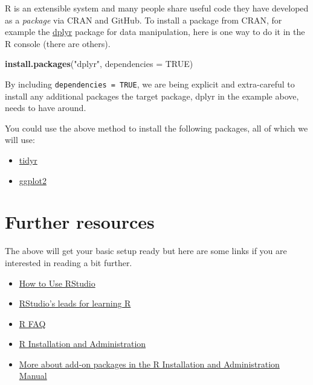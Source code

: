 \documentclass[
]{book}
\newenvironment{Shaded}{\begin{snugshade}}{\end{snugshade}}
\newcommand{\DataTypeTok}[1]{\textcolor[rgb]{0.13,0.29,0.53}{#1}}
\newcommand{\KeywordTok}[1]{\textcolor[rgb]{0.13,0.29,0.53}{\textbf{#1}}}
\newcommand{\NormalTok}[1]{#1}
\newcommand{\OtherTok}[1]{\textcolor[rgb]{0.56,0.35,0.01}{#1}}
\newcommand{\StringTok}[1]{\textcolor[rgb]{0.31,0.60,0.02}{#1}}
\providecommand{\tightlist}{%
  \setlength{\itemsep}{0pt}\setlength{\parskip}{0pt}}
\begin{document}
R is an extensible system and many people share useful code they have developed as a \emph{package} via CRAN and GitHub. To install a package from CRAN, for example the \href{https://dplyr.tidyverse.org}{dplyr} package for data manipulation, here is one way to do it in the R console (there are others).

\begin{Shaded}
\begin{Highlighting}[]
\KeywordTok{install.packages}\NormalTok{(}\StringTok{"dplyr"}\NormalTok{, }\DataTypeTok{dependencies =} \OtherTok{TRUE}\NormalTok{)}
\end{Highlighting}
\end{Shaded}

By including \texttt{dependencies\ =\ TRUE}, we are being explicit and extra-careful to install any additional packages the target package, dplyr in the example above, needs to have around.

You could use the above method to install the following packages, all of which we will use:

\begin{itemize}
\tightlist
\item
  \href{https://tidyr.tidyverse.org}{tidyr}
\item
  \href{https://ggplot2.tidyverse.org}{ggplot2}
\end{itemize}

\hypertarget{further-resources}{%
\section{Further resources}\label{further-resources}}

The above will get your basic setup ready but here are some links if you are interested in reading a bit further.

\begin{itemize}
\tightlist
\item
  \href{https://support.rstudio.com/hc/en-us}{How to Use RStudio}
\item
  \href{https://support.rstudio.com/hc/en-us/articles/200552336-Getting-Help-with-R}{RStudio's leads for learning R}
\item
  \href{https://cloud.r-project.org/faqs.html}{R FAQ}
\item
  \href{http://cloud.r-project.org/doc/manuals/R-admin.html}{R Installation and Administration}
\item
  \href{https://cloud.r-project.org/doc/manuals/R-admin.html\#Add_002don-packages}{More about add-on packages in the R Installation and Administration Manual}
\end{itemize}
\end{document}
